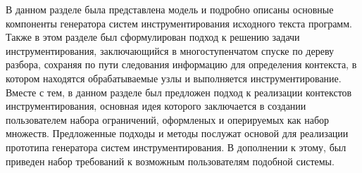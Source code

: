 В данном разделе была представлена модель и подробно описаны основные компоненты генератора систем инструментирования исходного текста программ.
Также в этом разделе был сформулирован подход к решению задачи инструментирования, заключающийся в многоступенчатом спуске по дереву разбора, сохраняя по пути следования информацию для определения контекста, в котором находятся обрабатываемые узлы и выполняется инструментирование.
Вместе с тем, в данном разделе был предложен подход к реализации контекстов инструментирования, основная идея которого заключается в создании пользователем набора ограничений, оформленых и оперируемых как набор множеств.
Предложенные подходы и методы послужат основой для реализации прототипа генератора систем инструментирования.
В дополнении к этому, был приведен набор требований к возможным пользователям подобной системы.
